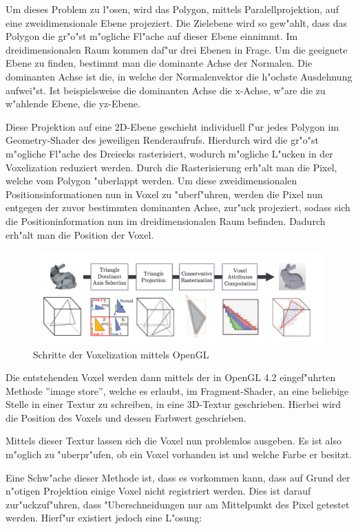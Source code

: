 \documentclass[a4paper, 12pt]{scrartcl}
\begin{document}
Um dieses Problem zu l"osen, wird das Polygon, mittels Paralellprojektion, auf eine zweidimensionale Ebene projeziert.
Die Zielebene wird so gew"ahlt, dass das Polygon die gr"o"st m"ogliche Fl"ache auf dieser Ebene einnimmt.
Im dreidimensionalen Raum kommen daf"ur drei Ebenen in Frage. 
Um die geeignete Ebene zu finden, bestimmt man die dominante Achse der Normalen. 
Die dominanten Achse ist die, in welche der Normalenvektor die h"ochste Ausdehnung aufwei"st.
Ist beispielsweise die dominanten Achse die x-Achse, w"are die zu w"ahlende Ebene, die yz-Ebene.

Diese Projektion auf eine 2D-Ebene geschieht individuell f"ur jedes Polygon im Geometry-Shader des jeweiligen Renderaufrufs.
Hierdurch wird die gr"o"st m"ogliche Fl"ache des Dreiecks rasterisiert, wodurch m"ogliche L"ucken in der Voxelization reduziert werden. Durch die Rasterisierung erh"alt man die Pixel, welche vom Polygon "uberlappt werden. Um diese zweidimensionalen Positionsinformationen nun in Voxel zu "uberf"uhren, werden die Pixel nun entgegen der zuvor bestimmten dominanten Achse, zur"uck projeziert, sodass sich die Positioninformation nun im dreidimensionalen Raum befinden. Dadurch erh"alt man die Position der Voxel.

\begin{figure}[h]
	\centering
		\includegraphics[width=16cm]{Voxelization-Pipeline}
	\caption{Schritte der Voxelization mittels OpenGL}
\end{figure}

Die entstehenden Voxel werden dann mittels der in OpenGL 4.2 eingef"uhrten Methode ''image store'', welche es erlaubt, im Fragment-Shader, an eine beliebige Stelle in einer Textur zu schreiben, in eine 3D-Textur geschrieben. Hierbei wird die Position des Voxels und dessen Farbwert geschrieben.


Mittels dieser Textur lassen sich die Voxel nun problemlos ausgeben. Es ist also m"oglich zu "uberpr"ufen, ob ein Voxel vorhanden ist und welche Farbe er besitzt.

Eine Schw"ache dieser Methode ist, dass es vorkommen kann, dass auf Grund der n"otigen Projektion einige Voxel nicht registriert werden. Dies ist darauf zur"uckzuf"uhren, dass "Uberschneidungen nur am Mittelpunkt des Pixel getestet werden. Hierf"ur existiert jedoch eine L"osung: 
\end{document}

